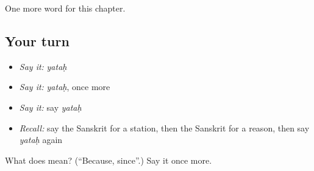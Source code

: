 \begin{grammarlens}[title={What you've built}]
One more word for this chapter.
\end{grammarlens}

\subsection*{Your turn}
\begin{itemize}
\raggedright
  \item \emph{Say it:} \emph{yataḥ}
  \item \emph{Say it:} \emph{yataḥ}, once more
  \item \emph{Say it:} say \emph{yataḥ}
  \item \emph{Recall:} say the Sanskrit for a station, then the Sanskrit for a reason, then say \emph{yataḥ} again
\end{itemize}

\begin{tcolorbox}[breakable,colback=teal!4,colframe=teal!35!black,title={Before you move on}]
What does  mean? (\textquotedblleft{}Because, since\textquotedblright{}.) Say it once more.
\end{tcolorbox}
